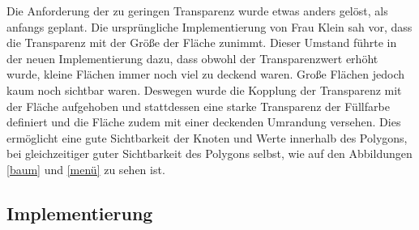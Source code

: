 Die Anforderung der zu geringen Transparenz wurde etwas anders gelöst, als anfangs geplant. Die ursprüngliche Implementierung von Frau Klein sah vor, dass die Transparenz mit der Größe der Fläche zunimmt. Dieser Umstand führte in der neuen Implementierung dazu, dass obwohl der Transparenzwert erhöht wurde, kleine Flächen immer noch viel zu deckend waren. Große Flächen jedoch kaum noch sichtbar waren. Deswegen wurde die Kopplung der Transparenz mit der Fläche aufgehoben und stattdessen eine starke Transparenz der Füllfarbe definiert und die Fläche zudem mit einer deckenden Umrandung versehen. Dies ermöglicht eine gute Sichtbarkeit der Knoten und Werte innerhalb des Polygons, bei gleichzeitiger guter Sichtbarkeit des Polygons selbst, wie auf den Abbildungen \ref{baum} und \ref{menü} zu sehen ist.



\subsection{Implementierung}
